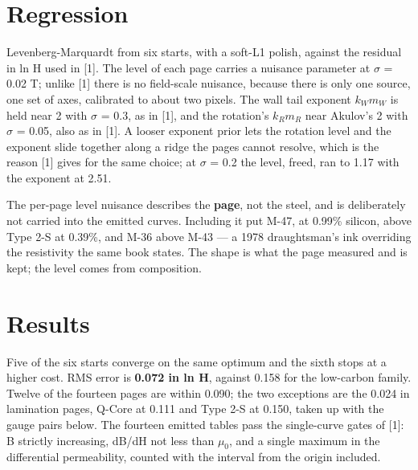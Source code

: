 \documentclass[
  11pt,
]{article}
\begin{document}
\section{Regression}\label{regression}

Levenberg-Marquardt from six starts, with a soft-L1 polish, against the residual in ln H used in {[}1{]}. The level of each page carries a nuisance parameter at \(\sigma\) = 0.02 T; unlike {[}1{]} there is no field-scale nuisance, because there is only one source, one set of axes, calibrated to about two pixels. The wall tail exponent \(k_W m_W\) is held near 2 with \(\sigma\) = 0.3, as in {[}1{]}, and the rotation's \(k_R m_R\) near Akulov's 2 with \(\sigma\) = 0.05, also as in {[}1{]}. A looser exponent prior lets the rotation level and the exponent slide together along a ridge the pages cannot resolve, which is the reason {[}1{]} gives for the same choice; at \(\sigma\) = 0.2 the level, freed, ran to 1.17 with the exponent at 2.51.

The per-page level nuisance describes the \textbf{page}, not the steel, and is deliberately not carried into the emitted curves. Including it put M-47, at 0.99\% silicon, above Type 2-S at 0.39\%, and M-36 above M-43 --- a 1978 draughtsman's ink overriding the resistivity the same book states. The shape is what the page measured and is kept; the level comes from composition.

\section{Results}\label{results}

Five of the six starts converge on the same optimum and the sixth stops at a higher cost. RMS error is \textbf{0.072 in ln H}, against 0.158 for the low-carbon family. Twelve of the fourteen pages are within 0.090; the two exceptions are the 0.024 in lamination pages, Q-Core at 0.111 and Type 2-S at 0.150, taken up with the gauge pairs below. The fourteen emitted tables pass the single-curve gates of {[}1{]}: B strictly increasing, dB/dH not less than \(\mu_0\), and a single maximum in the differential permeability, counted with the interval from the origin included.
\end{document}
